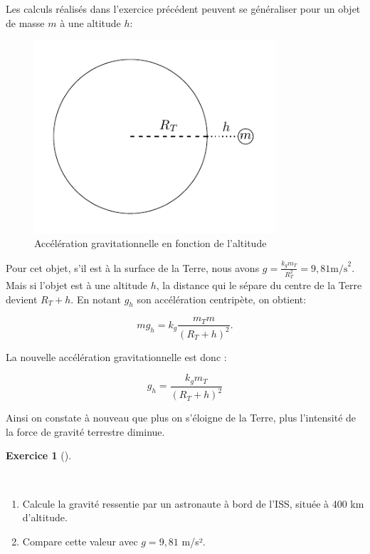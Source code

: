 \documentclass[
  letterpaper,
  DIV=11,
  numbers=noendperiod]{scrartcl}
\providecommand{\tightlist}{%
  \setlength{\itemsep}{0pt}\setlength{\parskip}{0pt}}\usepackage{longtable,booktabs,array}
\theoremstyle{definition}
\newtheorem{exercise}{Exercice}[section]
\theoremstyle{definition}
\theoremstyle{definition}
\theoremstyle{remark}
\begin{document}
Les calculs réalisés dans l'exercice précédent peuvent se généraliser
pour un objet de masse \(m\) à une altitude \(h\):

\begin{figure}[H]

{\centering \includegraphics[width=0.8\textwidth,height=\textheight]{figures/grav/fig5.pdf}

}

\caption{Accélération gravitationnelle en fonction de l'altitude}

\end{figure}%

Pour cet objet, s'il est à la surface de la Terre, nous avons
\(g = \frac{k_g m_T}{R_T^2}=9,81 \text{m/s}^2\). Mais si l'objet est à
une altitude \(h\), la distance qui le sépare du centre de la Terre
devient \(R_T + h\). En notant \(g_h\) son accélération centripète, on
obtient:

\[
mg_h=k_g\dfrac{m_Tm}{(R_T+h)^2}.
\]

La nouvelle accélération gravitationnelle est donc :

\[
g_h = \frac{k_g m_T}{(R_T + h)^2}
\]

Ainsi on constate à nouveau que plus on s'éloigne de la Terre, plus
l'intensité de la force de gravité terrestre diminue.

\begin{exercise}[]\protect\hypertarget{exr-gravite-altitude}{}\label{exr-gravite-altitude}

~

\begin{enumerate}
\def\labelenumi{\arabic{enumi}.}
\tightlist
\item
  Calcule la gravité ressentie par un astronaute à bord de l'ISS, située
  à 400 km d'altitude.
\item
  Compare cette valeur avec \(g = 9,81\) m/s².
\end{enumerate}

\end{exercise}
\end{document}
